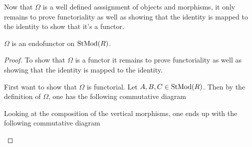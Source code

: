 Now that \( \Omega \) is a well defined asssignment of objects and morphisms, it only remains to prove functoriality as well as showing that the identity is mapped to the identity to show that it's a functor.

\begin{lemma}
    \label{lem:stmod_omega_endofunctor}
    \( \Omega \) is an endofunctor on \( \operatorname{StMod}(R) \).
\end{lemma}
\begin{proof}
    To show that \( \Omega \) is a functor it remains to prove functoriality as well as showing that the identity is mapped to the identity.

    First want to show that \( \Omega \) is functorial. Let \( A, B, C \in \operatorname{StMod}(R) \). Then by the definition of \( \Omega \), one has the following commutative diagram
    \begin{center}
    \end{center}

    Looking at the composition of the vertical morphisms, one ends up with the following commutative diagram
    \begin{center}
\end{center}
\end{proof}
